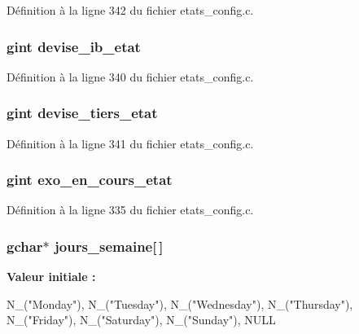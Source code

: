 Définition à la ligne 342 du fichier etats\_\-config.c.

\subsubsection[{devise\_\-ib\_\-etat}]{\setlength{\rightskip}{0pt plus 5cm}gint {\bf devise\_\-ib\_\-etat}}\label{etats__config_8c_a98f915576da9142adfe793e027729e2a}


Définition à la ligne 340 du fichier etats\_\-config.c.

\subsubsection[{devise\_\-tiers\_\-etat}]{\setlength{\rightskip}{0pt plus 5cm}gint {\bf devise\_\-tiers\_\-etat}}\label{etats__config_8c_ade4d3d82f703c4de9afda7c90b2235c0}


Définition à la ligne 341 du fichier etats\_\-config.c.

\subsubsection[{exo\_\-en\_\-cours\_\-etat}]{\setlength{\rightskip}{0pt plus 5cm}gint {\bf exo\_\-en\_\-cours\_\-etat}}\label{etats__config_8c_a56b05d8c0d7da3d30651f195bb372762}


Définition à la ligne 335 du fichier etats\_\-config.c.

\subsubsection[{jours\_\-semaine}]{\setlength{\rightskip}{0pt plus 5cm}gchar$\ast$ {\bf jours\_\-semaine}[$\,$]}\label{etats__config_8c_ac315591e8b0b5daecd30327b0a2224bf}
{\bfseries Valeur initiale :}
\begin{DoxyCode}
 {
    N_("Monday"),
    N_("Tuesday"),
    N_("Wednesday"),
    N_("Thursday"),
    N_("Friday"),
    N_("Saturday"),
    N_("Sunday"),
    NULL }
\end{DoxyCode}


